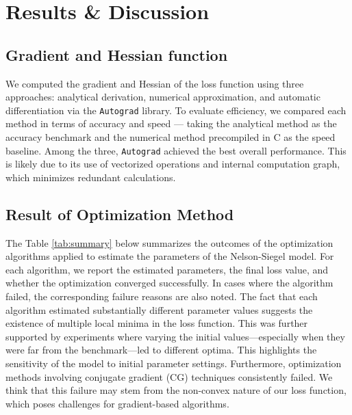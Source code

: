 \documentclass[12pt]{article}
\begin{document}
\section{Results \& Discussion}\label{sec:results}

\subsection{Gradient and Hessian function}

We computed the gradient and Hessian of the loss function using three approaches: analytical derivation, numerical approximation, and automatic differentiation via the \texttt{Autograd} library. To evaluate efficiency, we compared each method in terms of accuracy and speed — taking the analytical method as the accuracy benchmark and the numerical method precompiled in C as the speed baseline. Among the three, \texttt{Autograd} achieved the best overall performance. This is likely due to its use of vectorized operations and internal computation graph, which minimizes redundant calculations. 

\subsection{Result of Optimization Method }

The Table \ref{tab:summary} below summarizes the outcomes of the optimization algorithms applied to estimate the parameters of the Nelson-Siegel model. For each algorithm, we report the estimated parameters, the final loss value, and whether the optimization converged successfully. In cases where the algorithm failed, the corresponding failure reasons are also noted. The fact that each algorithm estimated substantially different parameter values suggests the existence of multiple local minima in the loss function. This was further supported by experiments where varying the initial values—especially when they were far from the benchmark—led to different optima. This highlights the sensitivity of the model to initial parameter settings.
Furthermore, optimization methods involving conjugate gradient (CG) techniques consistently failed. We think that this failure may stem from the non-convex nature of our loss function, which poses challenges for gradient-based algorithms.
\end{document}
